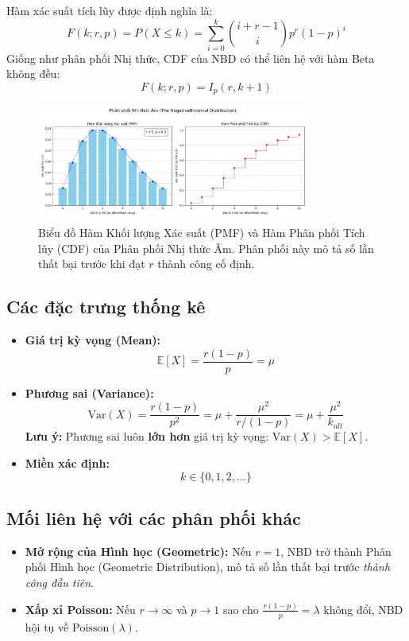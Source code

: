 Hàm xác suất tích lũy được định nghĩa là:
\[
F(k; r, p) = P(X \leq k) = \sum_{i = 0}^{k} \binom{i + r - 1}{i} p^r (1 - p)^{i}
\]
Giống như phân phối Nhị thức, CDF của NBD có thể liên hệ với hàm Beta không đều:
\[
F(k; r, p) = I_{p}(r, k + 1)
\]

\begin{figure}[h!]
 \centering
 \includegraphics[width=0.8\textwidth]{images/NegativeBinomial_PMF_and_CDF.png}
\caption{Biểu đồ Hàm Khối lượng Xác suất (PMF) và Hàm Phân phối Tích lũy (CDF) của Phân phối Nhị thức Âm. Phân phối này mô tả số lần thất bại trước khi đạt $r$ thành công cố định.}
\label{fig:nbinomial_dist}
\end{figure}

\subsection{Các đặc trưng thống kê}

\begin{itemize}
\item \textbf{Giá trị kỳ vọng (Mean):} 
 $$
\mathbb{E}[X] = \frac{r(1 - p)}{p} = \mu
    $$
\item \textbf{Phương sai (Variance):} 
$$
\mathrm{Var}(X) = \frac{r(1 - p)}{p^2} = \mu + \frac{\mu^2}{r/{(1-p)}} = \mu + \frac{\mu^2}{k_{alt}}
$$
    \textbf{Lưu ý:} Phương sai luôn \textbf{lớn hơn} giá trị kỳ vọng: $\mathrm{Var}(X) > \mathbb{E}[X]$.
\item \textbf{Miền xác định:}
 $$
 k \in \{0, 1, 2, \dots\}
 $$
\end{itemize}

\subsection{Mối liên hệ với các phân phối khác}

\begin{itemize}
\item \textbf{Mở rộng của Hình học (Geometric):} Nếu $r=1$, NBD trở thành Phân phối Hình học (Geometric Distribution), mô tả số lần thất bại trước \textit{thành công đầu tiên}.
\item \textbf{Xấp xỉ Poisson:} Nếu $r \to \infty$ và $p \to 1$ sao cho $\frac{r(1-p)}{p} = \lambda$ không đổi, NBD hội tụ về $\mathrm{Poisson}(\lambda)$.
\end{itemize}

